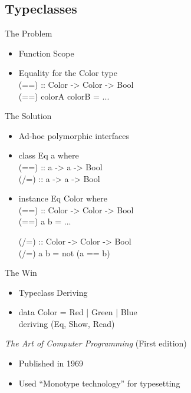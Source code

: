\documentclass{beamer}                  %
\newcommand{\srule}{
	\rule{\textwidth}{1pt}\\
}
\newlength{\subsecwidth}
\newenvironment{slide}{
	\begin{frame} %
	\settowidth{\subsecwidth}{\insertsubsection} %
	\ifthenelse{\dimtest{\subsecwidth}{<}{1pt}}{ %
		\frametitle{\insertsection\\             %
		\vspace{-1ex}                            %
		\color{fore}\srule                       %
		\par                                     %
		\vspace{-3ex}                            %
		}
	}{                                           %
		\frametitle{\insertsection\ -- \insertsubsection\\ %
		\vspace{-1ex}                            %
		\color{fore}\srule                       %
		\par                                     %
		\vspace{-3ex}                            %
		}
	}
	\Large                                       %
}{
	\end{frame}
}
\newcommand{\mediatitle}[1]{\textit{#1}}  %
\begin{document}
\subsection{Typeclasses}
\begin{slide}
  The Problem
  \begin{itemize}
    \item Function Scope
    \item Equality for the Color type\\
      \code
      (==) :: Color -> Color -> Bool\\
      (==) colorA colorB = ...
  \end{itemize}
\end{slide}

\begin{slide}
  The Solution
  \begin{itemize}
    \item Ad-hoc polymorphic interfaces
    \item
      \code
      class Eq a where\\
      (==) :: a -> a -> Bool\\
      (/=) :: a -> a -> Bool
    \item
      \code
      instance Eq Color where\\
        (==) :: Color -> Color -> Bool\\
        (==) a b = ...

        (/=) :: Color -> Color -> Bool\\
        (/=) a b = not (a == b)
  \end{itemize}
\end{slide}

\begin{slide}
  The Win
  \begin{itemize}
    \item Typeclass Deriving
    \item
      \code
      data Color = Red | Green | Blue\\
      deriving (Eq, Show, Read)

  \end{itemize}
\end{slide}






\begin{slide}
	\mediatitle{The Art of Computer Programming} (First edition)
	\begin{itemize}
		\item Published in 1969
		\item Used ``Monotype technology'' for typesetting
	\end{itemize}
\end{slide}
\end{document}

